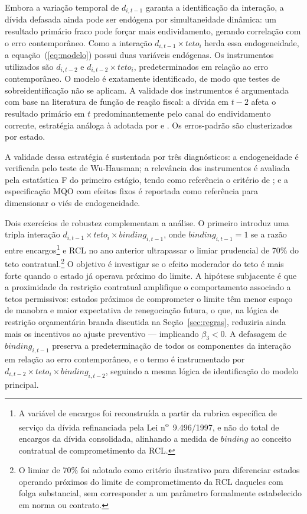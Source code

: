 Embora a variação temporal de $d_{i,t-1}$ garanta a identificação da interação, a dívida defasada ainda pode ser endógena por simultaneidade dinâmica: um resultado primário fraco pode forçar mais endividamento, gerando correlação com o erro contemporâneo. Como a interação $d_{i,t-1} \times teto_i$ herda essa endogeneidade, a equação~(\ref{eq:modelo}) possui duas variáveis endógenas. Os instrumentos utilizados são $d_{i,t-2}$ e $d_{i,t-2} \times teto_i$, predeterminados em relação ao erro contemporâneo. O modelo é exatamente identificado, de modo que testes de sobreidentificação não se aplicam. A validade dos instrumentos é argumentada com base na literatura de função de reação fiscal: a dívida em $t-2$ afeta o resultado primário em $t$ predominantemente pelo canal do endividamento corrente, estratégia análoga à adotada por  e . Os erros-padrão são clusterizados por estado.

A validade dessa estratégia é sustentada por três diagnósticos: a endogeneidade é verificada pelo teste de Wu-Hausman; a relevância dos instrumentos é avaliada pela estatística F do primeiro estágio, tendo como referência o critério de ; e a especificação MQO com efeitos fixos é reportada como referência para dimensionar o viés de endogeneidade.

Dois exercícios de robustez complementam a análise. O primeiro introduz uma tripla interação $d_{i,t-1} \times teto_i \times binding_{i,t-1}$, onde $binding_{i,t-1} = 1$ se a razão entre encargos\footnote{A variável de encargos foi reconstruída a partir da rubrica específica de serviço da dívida refinanciada pela Lei n\textsuperscript{o}~9.496/1997, e não do total de encargos da dívida consolidada, alinhando a medida de $binding$ ao conceito contratual de comprometimento da RCL.} e RCL no ano anterior ultrapassar o limiar prudencial de 70\% do teto contratual.\footnote{O limiar de 70\% foi adotado como critério ilustrativo para diferenciar estados operando próximos do limite de comprometimento da RCL daqueles com folga substancial, sem corresponder a um parâmetro formalmente estabelecido em norma ou contrato.} O objetivo é investigar se o efeito moderador do teto é mais forte quando o estado já operava próximo do limite. A hipótese subjacente é que a proximidade da restrição contratual amplifique o comportamento associado a tetos permissivos: estados próximos de comprometer o limite têm menor espaço de manobra e maior expectativa de renegociação futura, o que, na lógica de restrição orçamentária branda discutida na Seção~\ref{sec:regras}, reduziria ainda mais os incentivos ao ajuste preventivo --- implicando $\beta_3 < 0$. A defasagem de $binding_{i,t-1}$ preserva a predeterminação de todos os componentes da interação em relação ao erro contemporâneo, e o termo é instrumentado por $d_{i,t-2} \times teto_i \times binding_{i,t-2}$, seguindo a mesma lógica de identificação do modelo principal.

